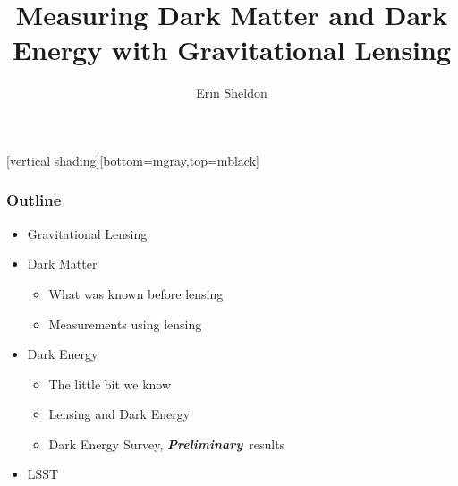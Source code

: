 \documentclass{beamer}
\title{Measuring Dark Matter and Dark Energy with Gravitational Lensing}
\author{Erin Sheldon}
\institute{Brookhaven National Laboratory}
\newcommand{\prelim}{{\bf{\it Preliminary}}}
\begin{document}
\frame{\titlepage}

\frame
{
}


[vertical shading][bottom=mgray,top=mblack]

\frame
{
    \frametitle{Outline}

 
    \begin{itemize}

        \item Gravitational Lensing

        \item Dark Matter

            \begin{itemize}
                \item What was known before lensing
                \item Measurements using lensing
            \end{itemize}

        \item Dark Energy
            \begin{itemize}
                \item The little bit we know
                \item Lensing and Dark Energy
                \item Dark Energy Survey, \prelim\ results
            \end{itemize}

        \item LSST

    \end{itemize}


}
\end{document}
